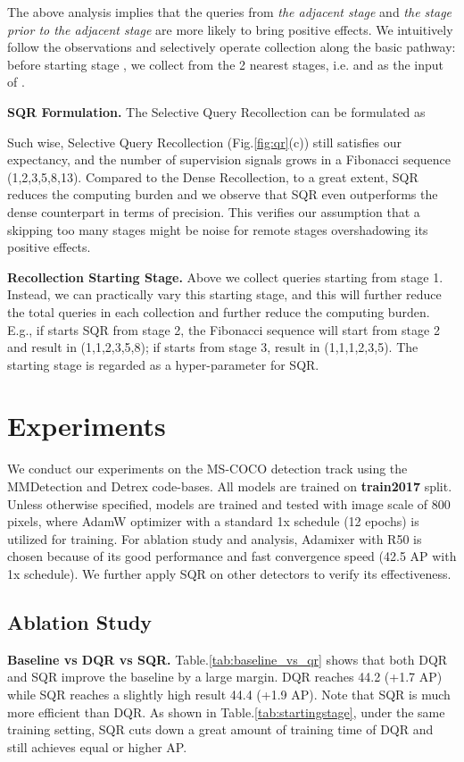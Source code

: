 \documentclass[10pt,twocolumn,letterpaper]{article}
\begin{document}
The above analysis implies that the queries from \emph{the adjacent stage} and \emph{the stage prior to the adjacent stage} are more likely to bring positive effects. We intuitively follow the observations and selectively operate collection along the basic pathway: before starting stage , we collect  from the 2 nearest stages, i.e.  and  as the input of . 

\textbf{SQR Formulation.} The Selective Query Recollection can be formulated as



Such wise, Selective Query Recollection (Fig.\ref{fig:qr}(c)) still satisfies our expectancy, and the number of supervision signals grows in a Fibonacci sequence (1,2,3,5,8,13). Compared to the Dense Recollection, to a great extent, SQR reduces the computing burden and we observe that SQR even outperforms the dense counterpart in terms of precision. This verifies our assumption that a  skipping too many stages might be noise for remote stages overshadowing its positive effects. 

\textbf{Recollection Starting Stage.} Above we collect queries starting from stage 1. Instead, we can practically vary this starting stage, and this will further reduce the total queries in each collection and further reduce the computing burden. E.g., if starts SQR from stage 2, the Fibonacci sequence will start from stage 2 and result in (1,1,2,3,5,8); if starts from stage 3, result in (1,1,1,2,3,5). The starting stage is regarded as a hyper-parameter for SQR.


\section{Experiments}
\label{sec:exp}

We conduct our experiments on the MS-COCO \cite{Lin2014MicrosoftCC} detection track using the MMDetection \cite{mmdetection} and Detrex \cite{ren2022detrex} code-bases. All models are trained on \textbf{train2017} split. Unless otherwise specified, models are trained and tested with image scale of 800 pixels, where AdamW optimizer with a standard 1x schedule (12 epochs) is utilized for training. For ablation study and analysis, Adamixer \cite{Gao2022AdaMixerAF} with R50 \cite{He2016DeepRL} is chosen because of its good performance and fast convergence speed (42.5 AP with 1x schedule). We further apply SQR on other detectors to verify its effectiveness. 

\subsection{Ablation Study}
\textbf{Baseline vs DQR vs SQR.} Table.\ref{tab:baseline_vs_qr} shows that both DQR and SQR improve the baseline by a large margin. DQR reaches 44.2 (+1.7 AP) while SQR reaches a slightly high result 44.4 (+1.9 AP). Note that SQR is much more efficient than DQR. As shown in Table.\ref{tab:startingstage}, under the same training setting, SQR cuts down a great amount of training time of DQR and still achieves equal or higher AP. 
\end{document}
